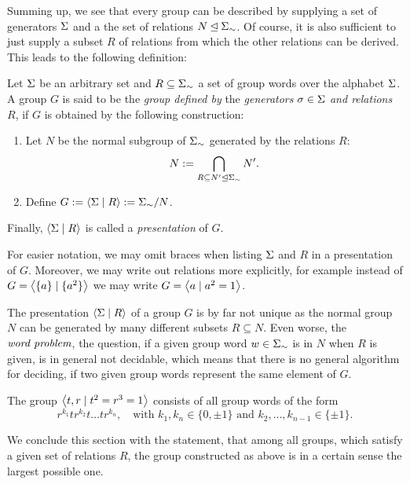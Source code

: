 Summing up, we see that every group can be described by supplying a set of generators $\Sigma$ and a the set of relations $N \unlhd {\Sigma}_{\sim}$. Of course, it is also sufficient to just supply a subset $R$ of relations from which the other relations can be derived. This leads to the following definition:

\begin{definition}
\label{dfn_GrpConstructGenRel}
Let $\Sigma$ be an arbitrary set and $R \subseteq {\Sigma}_{\sim}$ a set of group words over the alphabet $\Sigma$. A group $G$ is said to be the \emph{group defined by} the \emph{generators} $\sigma \in \Sigma$ \emph{and relations} $R$, if $G$ is obtained by the following construction:
\begin{enumerate}
\item Let $N$ be the normal subgroup of ${\Sigma}_{\sim}$ generated by the relations $R$:
\begin{equation*}
N := \bigcap_{R \subseteq N^{\prime} \unlhd {\Sigma}_{\sim}} N^{\prime}.
\end{equation*}
\item Define $G := \left\langle \Sigma \mid R \right\rangle := {\Sigma}_{\sim}/N$.
\end{enumerate}
Finally, $\left\langle \Sigma \mid R \right\rangle$ is called a \emph{presentation} of $G$.

For easier notation, we may omit braces when listing $\Sigma$ and $R$ in a presentation of $G$. Moreover, we may write out relations more explicitly, for example instead of $G = \left\langle \{a\} \mid \{a^2\} \right\rangle$ we may write $G = \left\langle a \mid a^2 = 1 \right\rangle$.
\end{definition}

\begin{remark}
The presentation $\left\langle \Sigma \mid R \right\rangle$ of a group $G$ is by far not unique as the normal group $N$ can be generated by many different subsets $R \subseteq N$. Even worse, the $\emph{word problem}$, \ie the question, if a given group word $w \in {\Sigma}_{\sim}$ is in $N$ when $R$ is given, is in general not decidable, which means that there is no general algorithm for deciding, if two given group words represent the same element of $G$.
\end{remark}

\begin{example}
The group $\left\langle t,r \mid t^2 = r^3 = 1 \right\rangle$ consists of all group words of the form
\begin{equation*}
\label{ex_RTGroup}
r^{k_1} t r^{k_2} t \dots t r^{k_n}, \quad 
\text {with } k_1, k_n \in \{0,\pm 1\} \text{ and } k_2, \dots, k_{n-1} \in \{\pm 1\}.
\end{equation*}
\end{example}
We conclude this section with the statement, that among all groups, which satisfy a given set of relations $R$, the group constructed as above is in a certain sense the largest possible one.

